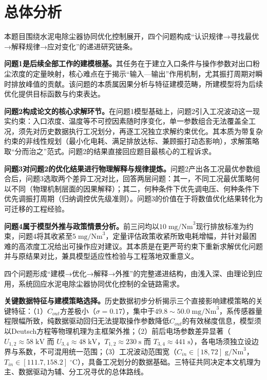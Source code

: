\section{总体分析}

本题目围绕水泥电除尘器协同优化控制展开，四个问题构成“认识规律→寻找最优→解释规律→应对变化”的递进研究链条。

\textbf{问题1是后续全部工作的建模根基。}其任务在于建立入口条件与操作参数对出口粉尘浓度的定量映射，核心难点在于揭示“输入—输出”作用机制，尤其振打周期对瞬时排放峰值的贡献。该问题的本质属因果分析与特征建模范畴，所建模型将为后续优化提供目标函数与约束表达。

\textbf{问题2构成论文的核心求解环节。}在问题1模型基础上，问题2引入工况波动这一现实约束：入口浓度、温度等不可控因素随时序变化，单一参数组合无法覆盖全工况，须先对历史数据执行工况划分，再逐工况独立求解约束优化。其本质为带复杂约束的非线性规划（最小化电耗、满足排放达标、兼顾振打动态影响），求解策略取“分而治之”范式。问题2的结果直接回应题目最核心的工程诉求。

\textbf{问题3对问题2的优化结果进行物理解释与规律提炼。}问题2产出各工况最优参数组合后，问题3选取两个差异工况对比，回答两层问题：其一，不同工况最优策略何以不同（物理机制层面的因果解释）；其二，何种条件下优先调电压、何种条件下优先调振打周期（归纳调控优先级准则）。问题3的价值在于将数值优化结果转化为可迁移的工程经验。

\textbf{问题4属于模型外推与政策情景分析。}前三问均以$10\;\text{mg/Nm}^3$现行排放标准为约束，问题4将其收紧至$5\;\text{mg/Nm}^3$，定量评估政策收紧所致电耗增幅，并针对最困难的高浓度工况给出可操作应对建议。其本质是在更严苛约束下重新求解优化问题并与原结果对比，兼具模型适应性检验与工程落地双重意义。

四个问题形成“建模→优化→解释→外推”的完整递进结构，由浅入深、由理论到应用，系统回应水泥电除尘器协同优化控制的全链路需求。

\textbf{关键数据特征与建模策略选择。}历史数据初步分析揭示三个直接影响建模策略的关键特征：（1）$C_{out}$方差极小（$\sigma=0.17$），集中于$49.8\sim50.0\;\text{mg/Nm}^3$，系传感器量程限幅所致，纯数据驱动回归无法提取操作参数降低$C_{out}$的有效梯度信息，模型须以Deutsch方程等物理机理为主框架外推；（2）前后电场参数差异显著（$U_{1,2}\approx58\;\text{kV}$ 而 $U_{3,4}\approx48\;\text{kV}$，$T_{1,2}\approx230\;\text{s}$ 而 $T_{3,4}\approx441\;\text{s}$），各电场须独立设边界与系数，不可混用统一范围；（3）工况波动范围宽（$C_{in}\in[18,72]\;\text{g/Nm}^3$，$T_{in}\in[111.7,158.2]\;{}^\circ\text{C}$），具备工况划分的数据基础。三特征共同决定本文机理为主、数据驱动为辅、分工况寻优的总体路线。
